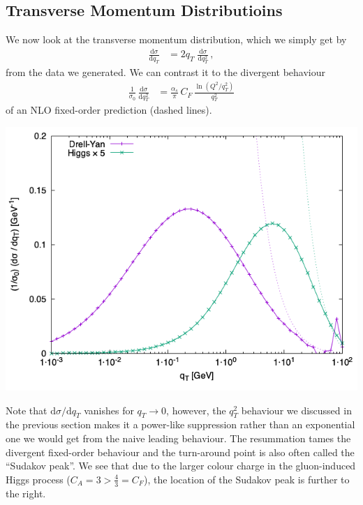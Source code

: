\documentclass[11pt]{article}
\begin{document}
\subsection{Transverse Momentum Distributioins}
\label{sec:orgb84df7c}
We now look at the transverse momentum distribution, which we simply get by
\begin{align}
  \frac{\mathrm{d}\sigma}{\mathrm{d}q_T}
  &=
  2 q_T \; \frac{\mathrm{d}\sigma}{\mathrm{d}q_T^2}
  \,,
\end{align}
from the data we generated.
We can contrast it to the divergent behaviour
\begin{align}
  \frac{1}{\sigma_0}\,\frac{\mathrm{d}\sigma}{\mathrm{d}q_T^2}
  &=
  \frac{\alpha_s}{\pi}\, C_F \, \frac{\ln(Q^2 / q_T^2)}{q_T^2}
\end{align}
of an NLO fixed-order prediction (dashed lines).
\begin{center}
\includegraphics[width=.9\linewidth]{plot_dy.png}
\label{}
\end{center}
Note that \(\mathrm{d}\sigma/\mathrm{d}q_T\) vanishes for \(q_T\to0\), however, the \(q_T^2\) behaviour we discussed in the previous section makes it a power-like suppression rather than an exponential one we would get from the naive leading behaviour.
The resummation tames the divergent fixed-order behaviour and the turn-around point is also often called the ``Sudakov peak''.
We see that due to the larger colour charge in the gluon-induced Higgs process (\(C_A = 3 > \tfrac{4}{3} = C_F\)), the location of the Sudakov peak is further to the right.
\end{document}
